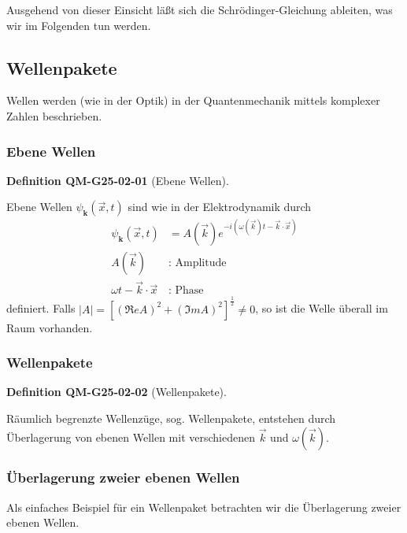 \documentclass[10pt, letterpaper]{article}
\newcommand{\CustomHeading}[3]{%
  \par\medskip\noindent%
  \textbf{#1 #2} \textnormal{(#3)}.\enskip%
}
\newenvironment{DEF}[2]{\begin{unitbox}\CustomHeading{Definition}{#1}{#2}}{\end{unitbox}}
\begin{document}
Ausgehend von dieser Einsicht läßt sich die Schrödinger-Gleichung ableiten, was wir im Folgenden tun werden.



\subsection{Wellenpakete}


Wellen werden (wie in der Optik) in der Quantenmechanik mittels komplexer Zahlen beschrieben.



\subsubsection*{Ebene Wellen}


\begin{DEF}{QM-G25-02-01}{Ebene Wellen}
Ebene Wellen $\psi_{\mathbf{k}}(\vec{x}, t)$ sind wie in der Elektrodynamik durch
$$
\begin{aligned}
\psi_{\mathbf{k}}(\vec{x}, t) & =A(\vec{k}) e^{-i(\omega(\vec{k}) t-\vec{k} \cdot \vec{x})} \\
A(\vec{k}) & : \text { Amplitude } \\
\omega t-\vec{k} \cdot \vec{x} & : \text { Phase }
\end{aligned}
$$
definiert. Falls $|A|=\left[(\Re e A)^{2}+(\Im m A)^{2}\right]^{\frac{1}{2}} \neq 0$, so ist die Welle überall im Raum vorhanden.
\end{DEF}



\subsubsection*{Wellenpakete}

\begin{DEF}{QM-G25-02-02}{Wellenpakete}
Räumlich begrenzte Wellenzüge, sog. Wellenpakete, entstehen durch Überlagerung von ebenen Wellen mit verschiedenen $\vec{k}$ und $\omega(\vec{k})$.
\end{DEF}

\subsubsection*{Überlagerung zweier ebenen Wellen}

Als einfaches Beispiel für ein Wellenpaket betrachten wir die Überlagerung zweier ebenen Wellen.
\end{document}
